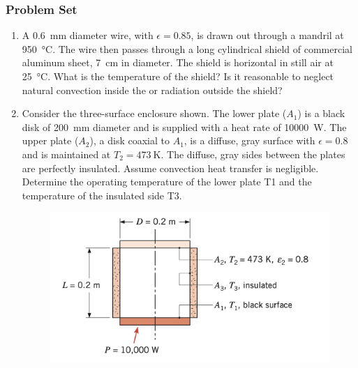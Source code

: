 \documentclass[12pt,letterpaper]{article}
\begin{document}
\subsubsection*{Problem Set}
\begin{enumerate}
    \item A \SI{0.6}{\milli\meter} diameter wire, with $\epsilon = 0.85$, is drawn out through a mandril at \SI{950}{\celsius}.
        The wire then passes through a long cylindrical shield of commercial aluminum sheet, \SI{7}{\centi\meter} in diameter.
        The shield is horizontal in still air at \SI{25}{\celsius}.
        What is the temperature of the shield?
        Is it reasonable to neglect natural convection inside the or radiation outside the shield?

    \item Consider the three-surface enclosure shown.
        The lower plate ($A_1$) is a black disk of \SI{200}{\milli\meter} diameter and is supplied with a heat rate of \SI{10000}{\watt}.
        The upper plate ($A_2$), a disk coaxial to $A_1$, is a diffuse, gray surface with $\epsilon = 0.8$ and is maintained at $T_2 = \SI{473}{\kelvin}$.
        The diffuse, gray sides between the plates are perfectly insulated. Assume convection heat transfer is negligible.
        Determine the operating temperature of the lower plate T1 and the temperature of the insulated side T3.
    
    \begin{figure}[!htpb]
        \centering
        \includegraphics[width=0.75\linewidth]{./radiation_image.png}
    \end{figure}


\end{enumerate}
\end{document}
